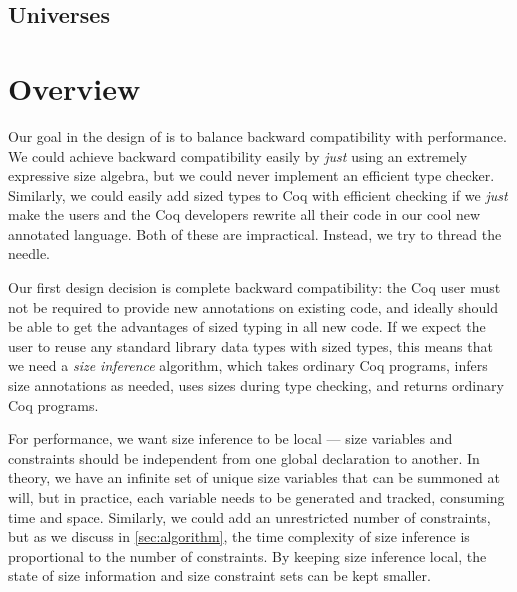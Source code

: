 
\subsection{Universes}


\section{Overview}\label{sec:sponge-cake}
Our goal in the design of \lang is to balance backward compatibility with performance.
We could achieve backward compatibility easily by \emph{just} using an extremely expressive size algebra, but we could never implement an efficient type checker.
Similarly, we could easily add sized types to Coq with efficient checking if we \emph{just} make the users and the Coq developers rewrite all their code in our cool new annotated language.
Both of these are impractical.
Instead, we try to thread the needle.

Our first design decision is complete backward compatibility: the Coq user must not be required to provide new annotations on existing code, and ideally should be able to get the advantages of sized typing in all new code.
If we expect the user to reuse any standard library data types with sized types, this means that we need a \emph{size inference} algorithm, which takes ordinary Coq programs, infers size annotations as needed, uses sizes during type checking, and returns ordinary Coq programs.

For performance, we want size inference to be local --- size variables and constraints should be independent from one global declaration to another.
In theory, we have an infinite set of unique size variables that can be summoned at will, but in practice, each variable needs to be generated and tracked, consuming time and space.
Similarly, we could add an unrestricted number of constraints, but as we discuss in \autoref{sec:algorithm}, the time complexity of size inference is proportional to the number of constraints.
By keeping size inference local, the state of size information and size constraint sets can be kept smaller.

